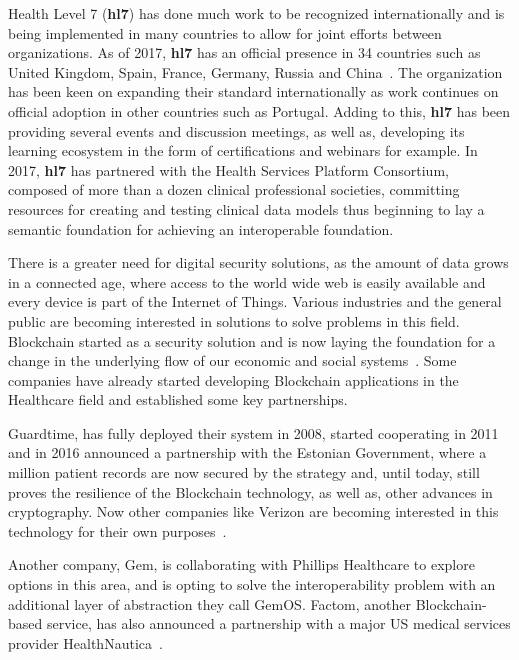 Health Level 7 (\textbf{hl7}) has done much work to be recognized
internationally and is being implemented in many countries to allow for joint
efforts between organizations. As of 2017, \textbf{hl7} has an official
presence in 34 countries such as United Kingdom, Spain, France, Germany, Russia
and China~\cite{HL7Anual2016}. The organization has been keen on expanding
their standard internationally as work continues on official adoption in other
countries such as Portugal. Adding to this, \textbf{hl7} has been providing
several events and discussion meetings, as well as, developing its learning
ecosystem in the form of certifications and webinars for example. In 2017,
\textbf{hl7} has partnered with the Health Services Platform Consortium,
composed of more than a dozen clinical professional societies, committing
resources for creating and testing clinical data models thus beginning to lay a
semantic foundation for achieving an interoperable foundation.

There is a greater need for digital security solutions, as the amount of data
grows in a connected age, where access to the world wide web is easily
available and every device is part of the Internet of Things. Various
industries and the general public are becoming interested in solutions to solve
problems in this field. Blockchain started as a security solution and is now
laying the foundation for a change in the underlying flow of our economic and
social systems~\cite{Zago2018,Marr2018,Long2018}. Some companies have already
started developing Blockchain applications in the Healthcare field and
established some key partnerships.

Guardtime, has fully deployed their system in 2008, started cooperating in 2011
and in 2016 announced a partnership with the Estonian Government, where a
million patient records are now secured by the strategy and, until today, still
proves the resilience of the Blockchain technology, as well as, other advances
in cryptography.  Now other companies like Verizon are becoming interested in
this technology for their own
purposes~\cite{GuardTime2018,EstonianGovernmentGuardTime2016}.

Another company, Gem, is collaborating with Phillips Healthcare to explore
options in this area, and is opting to solve the interoperability problem with
an additional layer of abstraction they call GemOS.  Factom, another
Blockchain-based service, has also announced a partnership with a major US
medical services provider
HealthNautica~\cite{BlockchainCompHealth2017,FactomPartnership2017}.

